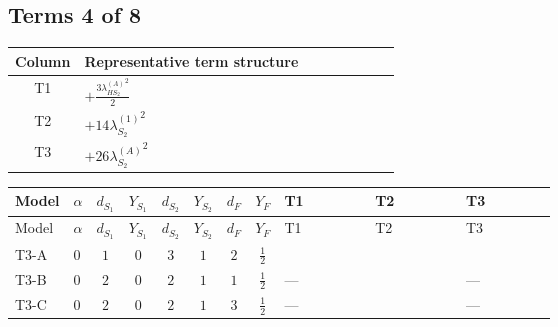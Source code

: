 \documentclass[8pt]{article}
\begin{document}
\begin{landscape}
\subsection*{Terms 4 of 8}
\begin{center}
\begin{tabular}{@{}c >{\raggedright\arraybackslash}p{0.82\linewidth}@{}}
\toprule
Column & Representative term structure \\
\midrule
T1 & \(\displaystyle +\frac{3 {\lambda_{HS_2}^{(A)}}^2}{2}\) \\
\midrule
T2 & \(\displaystyle +14 {\lambda_{S_2}^{(1)}}^2\) \\
\midrule
T3 & \(\displaystyle +26 {\lambda_{S_2}^{(A)}}^2\) \\
\midrule
\bottomrule
\end{tabular}
\end{center}
\smallskip
\tiny
\begin{longtable}{@{}llcccccc >{\raggedright\arraybackslash}p{0.21\linewidth} >{\raggedright\arraybackslash}p{0.21\linewidth} >{\raggedright\arraybackslash}p{0.21\linewidth}@{}}
\toprule
Model & $\alpha$ & $d_{S_1}$ & $Y_{S_1}$ & $d_{S_2}$ & $Y_{S_2}$ & $d_F$ & $Y_F$ & T1 & T2 & T3 \\
\midrule
\endfirsthead
\toprule
Model & $\alpha$ & $d_{S_1}$ & $Y_{S_1}$ & $d_{S_2}$ & $Y_{S_2}$ & $d_F$ & $Y_F$ & T1 & T2 & T3 \\
\midrule
\endhead
T3-A & $0$ & $1$ & $0$ & $3$ & $1$ & $2$ & $\frac{1}{2}$ & \scriptsize\adjustbox{max width=\linewidth}{$\begin{gathered} +\frac{3 {\lambda_{HS_2}^{(A)}}^2}{2}\end{gathered}$} & \scriptsize\adjustbox{max width=\linewidth}{$\begin{gathered} +14 {\lambda_{S_2}^{(1)}}^2\end{gathered}$} & \scriptsize\adjustbox{max width=\linewidth}{$\begin{gathered} +26 {\lambda_{S_2}^{(A)}}^2\end{gathered}$} \\
\midrule
T3-B & $0$ & $2$ & $0$ & $2$ & $1$ & $1$ & $\frac{1}{2}$ & --- & \scriptsize\adjustbox{max width=\linewidth}{$\begin{gathered} +12 {\lambda_{S_2}^{(1)}}^2\end{gathered}$} & --- \\
\midrule
T3-C & $0$ & $2$ & $0$ & $2$ & $1$ & $3$ & $\frac{1}{2}$ & --- & \scriptsize\adjustbox{max width=\linewidth}{$\begin{gathered} +12 {\lambda_{S_2}^{(1)}}^2\end{gathered}$} & --- \\

\end{longtable}
\end{landscape}
\end{document}
